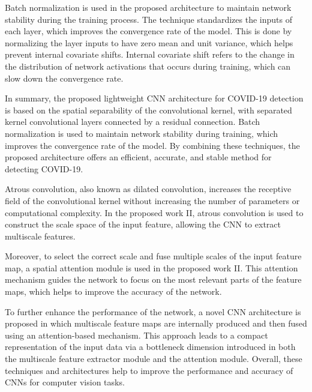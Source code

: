 Batch normalization is used in the proposed architecture to maintain network stability during the training process. The technique standardizes the inputs of each layer, which improves the convergence rate of the model. This is done by normalizing the layer inputs to have zero mean and unit variance, which helps prevent internal covariate shifts. Internal covariate shift refers to the change in the distribution of network activations that occurs during training, which can slow down the convergence rate.

In summary, the proposed lightweight CNN architecture for COVID-19 detection is based on the spatial separability of the convolutional kernel, with separated kernel convolutional layers connected by a residual connection. Batch normalization is used to maintain network stability during training, which improves the convergence rate of the model. By combining these techniques, the proposed architecture offers an efficient, accurate, and stable method for detecting COVID-19.

Atrous convolution, also known as dilated convolution, increases the receptive field of the convolutional kernel without increasing the number of parameters or computational complexity. In the proposed work II, atrous convolution is used to construct the scale space of the input feature, allowing the CNN to extract multiscale features.

Moreover, to select the correct scale and fuse multiple scales of the input feature map, a spatial attention module is used in the proposed work II. This attention mechanism guides the network to focus on the most relevant parts of the feature maps, which helps to improve the accuracy of the network.

To further enhance the performance of the network, a novel CNN architecture is proposed in which multiscale feature maps are internally produced and then fused using an attention-based mechanism. This approach leads to a compact representation of the input data via a bottleneck dimension introduced in both the multiscale feature extractor module and the attention module. Overall, these techniques and architectures help to improve the performance and accuracy of CNNs for computer vision tasks.
